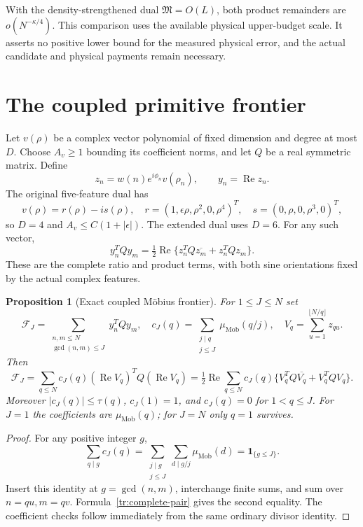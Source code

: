 \documentclass[11pt]{article}
\numberwithin{equation}{section}
\newtheorem{proposition}[theorem]{Proposition}
\theoremstyle{definition}
\theoremstyle{remark}
\begin{document}
With the density-strengthened dual $\mathfrak M=O(L)$, both product
remainders are $o(N^{-\kappa/4})$.  This comparison uses the available
physical upper-budget scale.  It asserts no positive lower bound for the
measured physical error, and the actual candidate and physical payments
remain necessary.

\section{The coupled primitive frontier}
\label{tr:primitive-section}

Let $v(\rho)$ be a complex vector polynomial of fixed dimension and degree
at most $D$.  Choose $A_v\ge1$ bounding its coefficient norms, and let
$Q$ be a real symmetric matrix.  Define
\[
 z_n=w(n)e^{i\phi_n}v(\rho_n),\qquad y_n=\operatorname{Re}z_n.
\]
The original five-feature dual has
\[
 v(\rho)=r(\rho)-is(\rho),\quad
 r=(1,\epsilon\rho,\rho^2,0,\rho^4)^T,\quad
 s=(0,\rho,0,\rho^3,0)^T,
\]
so $D=4$ and $A_v\le C(1+|\epsilon|)$.  The extended dual uses $D=6$.
For any such vector,
\begin{equation}
\label{tr:complete-pair}
 y_n^TQy_m=\tfrac12\operatorname{Re}
 \{z_n^TQ\overline{z_m}+z_n^TQz_m\}.
\end{equation}
These are the complete ratio and product terms, with both sine
orientations fixed by the actual complex features.

\begin{proposition}[Exact coupled M\"obius frontier]
\label{tr:mobius}
For $1\le J\le N$ set
\[
 \mathcal F_J=\sum_{\substack{n,m\le N\\\gcd(n,m)\le J}}y_n^TQy_m,
 \quad
 c_J(q)=\sum_{\substack{j\mid q\\j\le J}}\mu_{\mathrm{Mob}}(q/j),
 \quad V_q=\sum_{u=1}^{\lfloor N/q\rfloor}z_{qu}.
\]
Then
\begin{equation}
\label{tr:mobius-formula}
 \mathcal F_J=\sum_{q\le N}c_J(q)
 (\operatorname{Re}V_q)^TQ(\operatorname{Re}V_q)
 =\tfrac12\operatorname{Re}\sum_{q\le N}c_J(q)
 \{V_q^TQ\overline{V_q}+V_q^TQV_q\}.
\end{equation}
Moreover $|c_J(q)|\le\tau(q)$, $c_J(1)=1$, and
$c_J(q)=0$ for $1<q\le J$.  For $J=1$ the coefficients are
$\mu_{\mathrm{Mob}}(q)$; for $J=N$ only $q=1$ survives.
\end{proposition}
\begin{proof}
For any positive integer $g$,
\[
 \sum_{q\mid g}c_J(q)=
 \sum_{\substack{j\mid g\\j\le J}}
 \sum_{d\mid g/j}\mu_{\mathrm{Mob}}(d)
 =\mathbf1_{\{g\le J\}}.
\]
Insert this identity at $g=\gcd(n,m)$, interchange finite sums, and sum
over $n=qu,m=qv$.  Formula~\eqref{tr:complete-pair} gives the second
equality.  The coefficient checks follow immediately from the same
ordinary divisor identity.
\end{proof}
\end{document}
